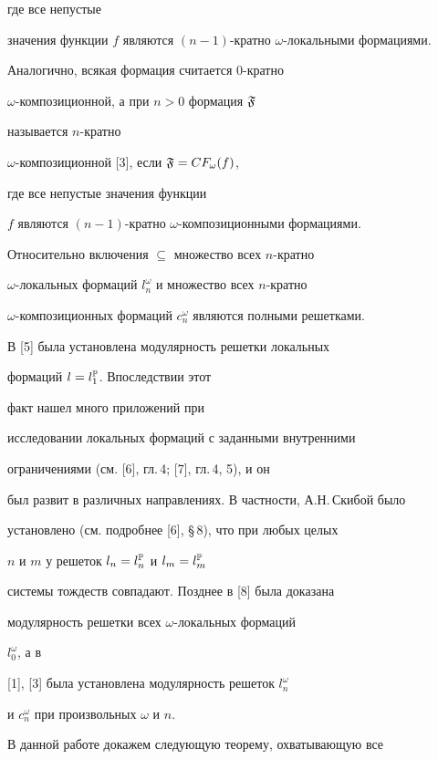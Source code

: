 где все непустые


значения функции $f$ являются $(n-1)$-кратно $\omega$-локальными формациями.


Аналогично, всякая формация считается $0$-кратно


$\omega$-композиционной, а при $n>0$ формация $\frak{F}$


называется $n$-кратно


$\omega$-композиционной [3], если $\frak{F}=CF_{\omega}(f)$,


где все непустые значения функции


$f$ являются $(n-1)$-кратно $\omega$-композиционными формациями.





Относительно включения $\subseteq$ множество всех $n$-кратно


$\omega$-локальных формаций $l_n^{\omega}$ и множество всех $n$-кратно


$\omega$-композиционных формаций $c_n^{\omega}$ являются полными решетками.





В [5] была установлена модулярность решетки локальных


формаций $l=l_1^{\Bbb{P}}$. Впоследствии этот


факт нашел много приложений при


исследовании локальных формаций с заданными внутренними


ограничениями (см. [6], гл.\,4; [7], гл.\,4, 5), и он


был развит в различных направлениях. В частности, А.Н.\,Скибой было


установлено (см. подробнее [6], \S\,8), что при любых целых


$n$ и $m$ у решеток $l_n=l_n^{\Bbb{P}}$ и $l_m=l_m^{\Bbb{P}}$


системы тождеств совпадают. Позднее в [8] была доказана


модулярность решетки всех $\omega$-локальных формаций


$l_0^{\omega}$, а в 


[1], [3] была установлена модулярность решеток $l_n^{\omega}$


и $c_n^{\omega}$ при произвольных $\omega$ и $n$.





В данной работе докажем следующую теорему, охватывающую все


